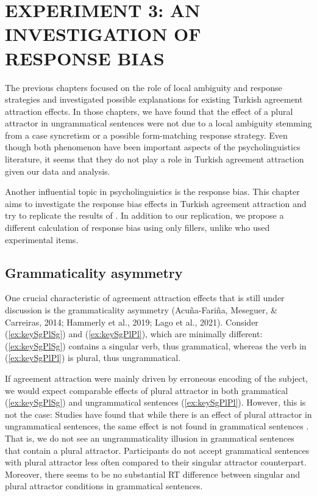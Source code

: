 
\chapter{EXPERIMENT 3: AN INVESTIGATION OF RESPONSE BIAS}  \label{ch:exp3}

The previous chapters focused on the role of local ambiguity and response strategies and investigated possible explanations for existing Turkish agreement attraction effects. In those chapters, we have found that the effect of a plural attractor in ungrammatical sentences were not due to a local ambiguity stemming from a case syncretism or a possible form-matching response strategy. Even though both phenomenon have been important aspects of the psycholinguistics literature, it seems that they do not play a role in Turkish agreement attraction given our data and analysis.

Another influential topic in psycholinguistics is the response bias. This chapter aims to investigate the response bias effects in Turkish agreement attraction and try to replicate the results of . In addition to our replication, we propose a different calculation of response bias using only fillers, unlike  who used experimental items. 

\section{Grammaticality asymmetry}
One crucial characteristic of agreement attraction effects that is still under discussion is the grammaticality asymmetry (Acu{\~n}a-Fari{\~n}a, Meseguer, \& Carreiras, 2014; Hammerly et al., 2019; Lago et al., 2021). Consider (\ref{ex:keySgPlSg}) and (\ref{ex:keySgPlPl}), which are minimally different: (\ref{ex:keySgPlSg}) contains a singular verb, thus grammatical, whereas the verb in (\ref{ex:keySgPlPl}) is plural, thus ungrammatical. 


\ea
  \z
\z

If agreement attraction were mainly driven by erroneous encoding of the subject, we would expect comparable effects of plural attractor in both grammatical (\ref{ex:keySgPlSg}) and ungrammatical sentences (\ref{ex:keySgPlPl}). However, this is not the case: Studies have found that while there is an effect of plural attractor in ungrammatical sentences, the same effect is not found in grammatical sentences \citep[][among others]{WagersEtAl:2009,LagoEtAl2015,LagoEtAl2019,JagerEtAl2020}. That is, we do not see an ungrammaticality illusion in grammatical sentences that contain a plural attractor. Participants do not accept grammatical sentences with plural attractor less often compared to their singular attractor counterpart. Moreover, there seems to be no substantial RT difference between singular and plural attractor conditions in grammatical sentences.

